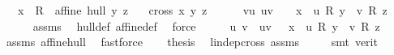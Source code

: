 \begin{isabellebody}
\ \ \ {\isachardoublequoteopen}{\isacharparenleft}{\kern0pt}x\ {\isacharcolon}{\kern0pt}{\isacharcolon}{\kern0pt}\ R{}{\isacharparenright}{\kern0pt}\ {\isasymin}\ affine\ hull\ {\isacharbraceleft}{\kern0pt}y{\isacharcomma}{\kern0pt}\ z{\isacharbraceright}{\kern0pt}{\isachardoublequoteclose}\isanewline
\ \ \ {\isachardoublequoteopen}cross{}\ x\ y\ z\ {\isacharequal}{\kern0pt}\ {}{\isachardoublequoteclose}\isanewline
%
\isadelimproof
%
\endisadelimproof
%
\isatagproof
{}\isamarkupfalse%
{\isacharminus}{\kern0pt}\isanewline
\ \ \isamarkupfalse%
\ {\isachardoublequoteopen}{\isasymexists}v{\isasymge}{}{\isachardot}{\kern0pt}{\isasymexists}u{\isasymge}{}{\isachardot}{\kern0pt}\ {\isacharparenleft}{\kern0pt}u{\isacharplus}{\kern0pt}v\ {\isacharequal}{\kern0pt}\ {}{\isacharparenright}{\kern0pt}\ {\isasymlongrightarrow}\ {\isacharparenleft}{\kern0pt}x\ {\isacharequal}{\kern0pt}\ u\ {\isacharasterisk}{\kern0pt}\isactrlsub R\ y\ {\isacharplus}{\kern0pt}\ v\ {\isacharasterisk}{\kern0pt}\isactrlsub R\ z{\isacharparenright}{\kern0pt}{\isachardoublequoteclose}\ \isanewline
\ \ \ \ \isamarkupfalse%
\ assms\ \isamarkupfalse%
\ hull{\isacharunderscore}{\kern0pt}def\ affine{\isacharunderscore}{\kern0pt}def\ \isamarkupfalse%
\ force\isanewline
\ \ \isamarkupfalse%
\ \isamarkupfalse%
\ u\ v\ \ {\isachardoublequoteopen}u{\isacharplus}{\kern0pt}v\ {\isacharequal}{\kern0pt}\ {}{\isachardoublequoteclose}\ {\isachardoublequoteopen}x\ {\isacharequal}{\kern0pt}\ u\ {\isacharasterisk}{\kern0pt}\isactrlsub R\ y\ {\isacharplus}{\kern0pt}\ v\ {\isacharasterisk}{\kern0pt}\isactrlsub R\ z{\isachardoublequoteclose}\isanewline
\ \ \ \ \isamarkupfalse%
\ assms\ affine{\isacharunderscore}{\kern0pt}hull{\isacharunderscore}{\kern0pt}{}\ \isamarkupfalse%
\ fastforce\isanewline
\ \ \isamarkupfalse%
\ {\isacharquery}{\kern0pt}thesis\ \isamarkupfalse%
\ lindep{\isacharunderscore}{\kern0pt}cross{}{\isacharunderscore}{\kern0pt}{}\ assms\ \ \ \ \isamarkupfalse%
\ {\isacharparenleft}{\kern0pt}smt\ {\isacharparenleft}{\kern0pt}verit{\isacharparenright}{\kern0pt}{\isacharparenright}{\kern0pt}\isanewline
{}\isamarkupfalse%
%
\endisatagproof
{\isafoldproof}%
%
\isadelimproof

\end{isabellebody}
